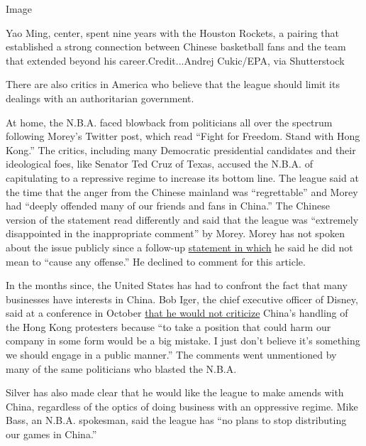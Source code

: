 Image

Yao Ming, center, spent nine years with the Houston Rockets, a pairing
that established a strong connection between Chinese basketball fans and
the team that extended beyond his career.Credit...Andrej Cukic/EPA, via
Shutterstock

There are also critics in America who believe that the league should
limit its dealings with an authoritarian government.

At home, the N.B.A. faced blowback from politicians all over the
spectrum following Morey's Twitter post, which read ``Fight for Freedom.
Stand with Hong Kong.'' The critics, including many Democratic
presidential candidates and their ideological foes, like Senator Ted
Cruz of Texas, accused the N.B.A. of capitulating to a repressive regime
to increase its bottom line. The league said at the time that the anger
from the Chinese mainland was ``regrettable'' and Morey had ``deeply
offended many of our friends and fans in China.'' The Chinese version of
the statement read differently and said that the league was ``extremely
disappointed in the inappropriate comment'' by Morey. Morey has not
spoken about the issue publicly since a follow-up
\href{https://twitter.com/dmorey/status/1181000808399114240?ref_src=twsrc\%5Etfw\%7Ctwcamp\%5Etweetembed\%7Ctwterm\%5E1181000808399114240\&ref_url=https\%3A\%2F\%2Fwww.nytimes.com\%2F2019\%2F10\%2F06\%2Fsports\%2Fdaryl-morey-rockets-china.html}{statement
in which} he said he did not mean to ``cause any offense.'' He declined
to comment for this article.

In the months since, the United States has had to confront the fact that
many businesses have interests in China. Bob Iger, the chief executive
officer of Disney, said at a conference in October
\href{https://www.bloomberg.com/news/articles/2019-10-23/disney-s-iger-says-he-won-t-take-position-on-hong-kong-protests}{that
he would not criticize} China's handling of the Hong Kong protesters
because ``to take a position that could harm our company in some form
would be a big mistake. I just don't believe it's something we should
engage in a public manner.'' The comments went unmentioned by many of
the same politicians who blasted the N.B.A.

Silver has also made clear that he would like the league to make amends
with China, regardless of the optics of doing business with an
oppressive regime. Mike Bass, an N.B.A. spokesman, said the league has
``no plans to stop distributing our games in China.''

